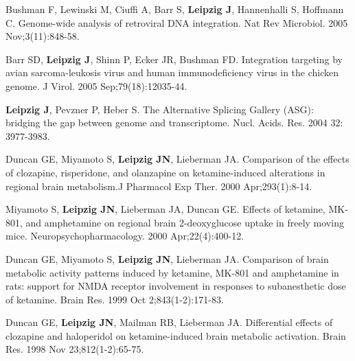 \documentclass{drexelthesis}
\begin{document}
Bushman F, Lewinski M, Ciuffi A, Barr S, \textbf{Leipzig J}, Hannenhalli S, Hoffmann C. Genome-wide analysis of retroviral DNA integration. Nat Rev Microbiol. 2005 Nov;3(11):848-58.

Barr SD, \textbf{Leipzig J}, Shinn P, Ecker JR, Bushman FD. Integration targeting by avian sarcoma-leukosis virus and human immunodeficiency virus in the chicken genome. J Virol. 2005 Sep;79(18):12035-44.

\textbf{Leipzig J}, Pevzner P, Heber S. The Alternative Splicing Gallery (ASG): bridging the gap between genome and transcriptome. Nucl. Acids. Res. 2004 32: 3977-3983.

Duncan GE, Miyamoto S,\textbf{ Leipzig JN}, Lieberman JA. Comparison of the effects of clozapine, risperidone, and olanzapine on ketamine-induced alterations in regional brain metabolism.J Pharmacol Exp Ther. 2000 Apr;293(1):8-14.

Miyamoto S, \textbf{Leipzig JN}, Lieberman JA, Duncan GE. Effects of ketamine, MK-801, and amphetamine on regional brain 2-deoxyglucose uptake in freely moving mice. Neuropsychopharmacology. 2000 Apr;22(4):400-12.

Duncan GE, Miyamoto S, \textbf{Leipzig JN}, Lieberman JA. Comparison of brain metabolic activity patterns induced by ketamine, MK-801 and amphetamine in rats: support for NMDA receptor involvement in responses to subanesthetic dose of ketamine. Brain Res. 1999 Oct 2;843(1-2):171-83.

Duncan GE, \textbf{Leipzig JN}, Mailman RB, Lieberman JA. Differential effects of clozapine and haloperidol on ketamine-induced brain metabolic activation. Brain Res. 1998 Nov 23;812(1-2):65-75.



%


\newpage 

\ %

\newpage
\end{document}
